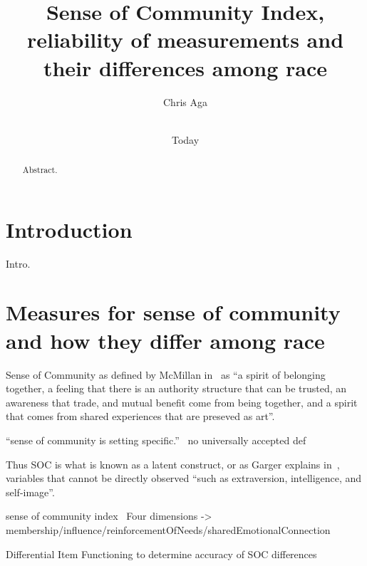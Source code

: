\documentclass{sig-alternate}
\begin{document}
\title{Sense of Community Index, reliability of measurements and their differences among race}
\author{
\alignauthor
Chris Aga \\
 \\
}

\date{Today}

\maketitle


\begin{abstract}
Abstract.
\end{abstract}

\keywords{}

\section{Introduction}
Intro.

 
\section{Measures for sense of community and how they differ among race}

Sense of Community as defined by McMillan in~\cite{senseOfCommunity:1996} as ``a spirit of belonging together, a feeling that there is an authority structure that can be trusted, an awareness that trade, and mutual benefit come from being together, and a spirit that comes from shared experiences that are preseved as art''.




``sense of
community is setting specific.''~\cite{cognitiveLearning:2002}
no universally accepted def

Thus SOC is what is known as a latent construct, or as Garger explains in~\cite{latent:2011}, variables that cannot be directly observed ``such as extraversion, intelligence, and self-image''.

sense of community index~\cite{disparities:2009}
Four dimensions -> membership/influence/reinforcementOfNeeds/sharedEmotionalConnection

Differential Item Functioning to determine accuracy of SOC differences
\end{document}

